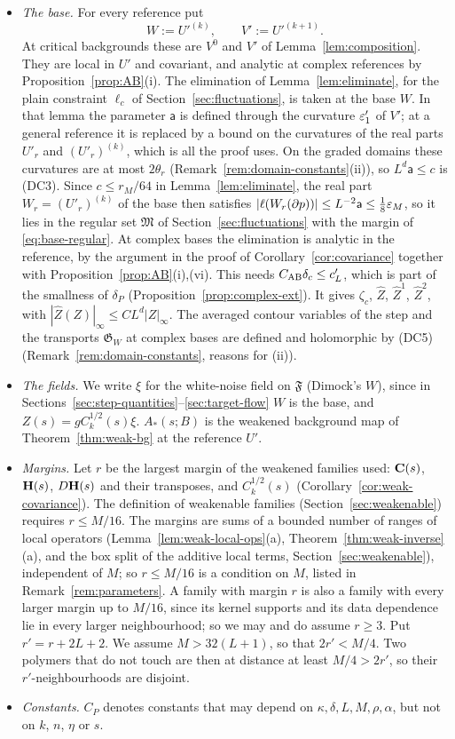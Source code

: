 \begin{itemize}
\item \emph{The base.} For every reference put
\[
W:=U'^{(k)},\qquad V':=U'^{(k+1)} .
\]
At critical backgrounds these are $V^0$ and $V'$ of Lemma~\ref{lem:composition}. They are local in $U'$ and covariant, and analytic at complex references by Proposition~\ref{prop:AB}(i). The elimination of Lemma~\ref{lem:eliminate}, for the plain constraint $\ell_c$ of Section~\ref{sec:fluctuations}, is taken at the base $W$. In that lemma the parameter $\mathsf a$ is defined through the curvature $\varepsilon'_1$ of $V'$; at a general reference it is replaced by a bound on the curvatures of the real parts $U'_r$ and $(U'_r)^{(k)}$, which is all the proof uses. On the graded domains these curvatures are at most $2\theta_r$ (Remark~\ref{rem:domain-constants}(ii)), so $L^d\mathsf a\le c$ is (DC3). Since $c\le r_M/64$ in Lemma~\ref{lem:eliminate}, the real part $W_r=(U'_r)^{(k)}$ of the base then satisfies $|\ell(W_r(\partial p))|\le L^{-2}\mathsf a\le\frac18\varepsilon_M$, so it lies in the regular set $\mathfrak M$ of Section~\ref{sec:fluctuations} with the margin of \eqref{eq:base-regular}. At complex bases the elimination is analytic in the reference, by the argument in the proof of Corollary~\ref{cor:covariance} together with Proposition~\ref{prop:AB}(i),(vi). This needs $C_{\rm AB}\delta_c\le c'_L$, which is part of the smallness of $\delta_P$ (Proposition~\ref{prop:complex-ext}). It gives $\zeta_c$, $\hat Z$, $\hat Z^1$, $\hat Z^2$, with $|\hat Z(Z)|_\infty\le CL^d|Z|_\infty$. The averaged contour variables of the step and the transports $\mathfrak G_W$ at complex bases are defined and holomorphic by (DC5) (Remark~\ref{rem:domain-constants}, reasons for (ii)).
\item \emph{The fields.} We write $\xi$ for the white-noise field on $\mathfrak F$ (Dimock's $W$), since in Sections~\ref{sec:step-quantities}--\ref{sec:target-flow} $W$ is the base, and $Z(s)=gC_k^{1/2}(s)\xi$. $A_*(s;B)$ is the weakened background map of Theorem~\ref{thm:weak-bg} at the reference $U'$.
\item \emph{Margins.} Let $r$ be the largest margin of the weakened families used: $\mathbf C(s)$, $\mathbf H(s)$, $D\mathbf H(s)$ and their transposes, and $C_k^{1/2}(s)$ (Corollary~\ref{cor:weak-covariance}). The definition of weakenable families (Section~\ref{sec:weakenable}) requires $r\le M/16$. The margins are sums of a bounded number of ranges of local operators (Lemma~\ref{lem:weak-local-ops}(a), Theorem~\ref{thm:weak-inverse}(a), and the box split of the additive local terms, Section~\ref{sec:weakenable}), independent of $M$; so $r\le M/16$ is a condition on $M$, listed in Remark~\ref{rem:parameters}. A family with margin $r$ is also a family with every larger margin up to $M/16$, since its kernel supports and its data dependence lie in every larger neighbourhood; so we may and do assume $r\ge3$. Put $r'=r+2L+2$. We assume $M>32(L+1)$, so that $2r'<M/4$. Two polymers that do not touch are then at distance at least $M/4>2r'$, so their $r'$-neighbourhoods are disjoint.
\item \emph{Constants.} $C_P$ denotes constants that may depend on $\kappa,\delta,L,M,\rho,\alpha$, but not on $k$, $n$, $\eta$ or $s$.
\end{itemize}

